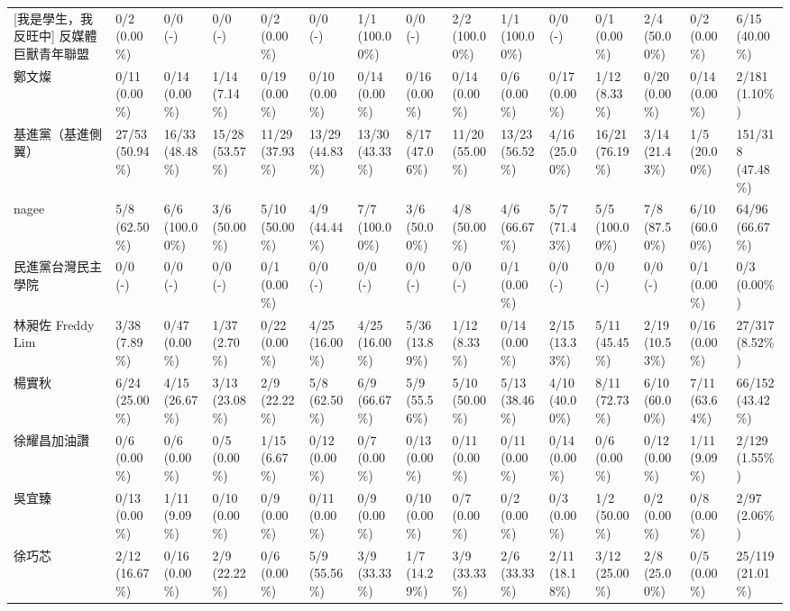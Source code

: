 \documentclass[a4paper, 10pt, conference]{ieeeconf}       %
\begin{document}
\begin{CJK}{UTF8}{bsmi}
\begin{landscape}
\begin{longtable}[c]{@{}L{2.45cm}L{1.1cm}L{1.1cm}L{1.1cm}L{1.1cm}L{1.1cm}L{1.1cm}L{1.1cm}L{1.1cm}L{1.1cm}L{1.1cm}L{1.1cm}L{1.1cm}L{1.1cm}L{1.1cm}@{}}
{[}我是學生，我反旺中{]} 反媒體巨獸青年聯盟 & 0/2 (0.00\%) & 0/0 (-) & 0/0 (-) & 0/2 (0.00\%) & 0/0 (-) & 1/1 (100.00\%) & 0/0 (-) & 2/2 (100.00\%) & 1/1 (100.00\%) & 0/0 (-) & 0/1 (0.00\%) & 2/4 (50.00\%) & 0/2 (0.00\%) & 6/15 (40.00\%) \\
鄭文燦 & 0/11 (0.00\%) & 0/14 (0.00\%) & 1/14 (7.14\%) & 0/19 (0.00\%) & 0/10 (0.00\%) & 0/14 (0.00\%) & 0/16 (0.00\%) & 0/14 (0.00\%) & 0/6 (0.00\%) & 0/17 (0.00\%) & 1/12 (8.33\%) & 0/20 (0.00\%) & 0/14 (0.00\%) & 2/181 (1.10\%) \\
基進黨（基進側翼） & 27/53 (50.94\%) & 16/33 (48.48\%) & 15/28 (53.57\%) & 11/29 (37.93\%) & 13/29 (44.83\%) & 13/30 (43.33\%) & 8/17 (47.06\%) & 11/20 (55.00\%) & 13/23 (56.52\%) & 4/16 (25.00\%) & 16/21 (76.19\%) & 3/14 (21.43\%) & 1/5 (20.00\%) & 151/318 (47.48\%) \\
nagee & 5/8 (62.50\%) & 6/6 (100.00\%) & 3/6 (50.00\%) & 5/10 (50.00\%) & 4/9 (44.44\%) & 7/7 (100.00\%) & 3/6 (50.00\%) & 4/8 (50.00\%) & 4/6 (66.67\%) & 5/7 (71.43\%) & 5/5 (100.00\%) & 7/8 (87.50\%) & 6/10 (60.00\%) & 64/96 (66.67\%) \\
民進黨台灣民主學院 & 0/0 (-) & 0/0 (-) & 0/0 (-) & 0/1 (0.00\%) & 0/0 (-) & 0/0 (-) & 0/0 (-) & 0/0 (-) & 0/1 (0.00\%) & 0/0 (-) & 0/0 (-) & 0/0 (-) & 0/1 (0.00\%) & 0/3 (0.00\%) \\
林昶佐 Freddy Lim & 3/38 (7.89\%) & 0/47 (0.00\%) & 1/37 (2.70\%) & 0/22 (0.00\%) & 4/25 (16.00\%) & 4/25 (16.00\%) & 5/36 (13.89\%) & 1/12 (8.33\%) & 0/14 (0.00\%) & 2/15 (13.33\%) & 5/11 (45.45\%) & 2/19 (10.53\%) & 0/16 (0.00\%) & 27/317 (8.52\%) \\
楊實秋 & 6/24 (25.00\%) & 4/15 (26.67\%) & 3/13 (23.08\%) & 2/9 (22.22\%) & 5/8 (62.50\%) & 6/9 (66.67\%) & 5/9 (55.56\%) & 5/10 (50.00\%) & 5/13 (38.46\%) & 4/10 (40.00\%) & 8/11 (72.73\%) & 6/10 (60.00\%) & 7/11 (63.64\%) & 66/152 (43.42\%) \\
徐耀昌加油讚 & 0/6 (0.00\%) & 0/6 (0.00\%) & 0/5 (0.00\%) & 1/15 (6.67\%) & 0/12 (0.00\%) & 0/7 (0.00\%) & 0/13 (0.00\%) & 0/11 (0.00\%) & 0/11 (0.00\%) & 0/14 (0.00\%) & 0/6 (0.00\%) & 0/12 (0.00\%) & 1/11 (9.09\%) & 2/129 (1.55\%) \\
吳宜臻 & 0/13 (0.00\%) & 1/11 (9.09\%) & 0/10 (0.00\%) & 0/9 (0.00\%) & 0/11 (0.00\%) & 0/9 (0.00\%) & 0/10 (0.00\%) & 0/7 (0.00\%) & 0/2 (0.00\%) & 0/3 (0.00\%) & 1/2 (50.00\%) & 0/2 (0.00\%) & 0/8 (0.00\%) & 2/97 (2.06\%) \\
徐巧芯 & 2/12 (16.67\%) & 0/16 (0.00\%) & 2/9 (22.22\%) & 0/6 (0.00\%) & 5/9 (55.56\%) & 3/9 (33.33\%) & 1/7 (14.29\%) & 3/9 (33.33\%) & 2/6 (33.33\%) & 2/11 (18.18\%) & 3/12 (25.00\%) & 2/8 (25.00\%) & 0/5 (0.00\%) & 25/119 (21.01\%) \\

\end{longtable}
\end{landscape}
\end{CJK}
\end{document}

